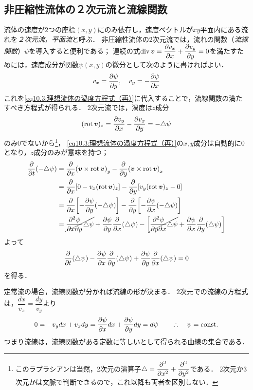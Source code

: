 \subsection*{非圧縮性流体の２次元流と流線関数}
流体の速度が2つの座標$(x,y)$にのみ依存し，速度ベクトルが$xy$平面内にある流れを\emph{２次元流，平面流}と呼ぶ．
非圧縮性流体の2次元流では，流れの関数（\emph{流線関数}）$\psi$を導入すると便利である；
連続の式$\Div\v = \dpdv{v_x}{x} + \dpdv{v_y}{y} = 0$を満たすためには，速度成分が関数$\psi(x,y)$の微分として次のように書ければよい．
\begin{equation}
    v_x = \pdv{\psi}{y}, \quad v_y = -\pdv{\psi}{x}
\end{equation}
これを\eqref{eq10.3:理想流体の渦度方程式（再）}に代入することで，流線関数の満たすべき方程式が得られる．
2次元流では，渦度は$z$成分
\[
    (\operatorname{rot}\vb*{v})_z = \pdv{v_y}{x} - \pdv{v_x}{y} = -\triangle\psi
\]
のみ0でないから\footnote{
このラプラシアンは当然，2次元の演算子$\Laplacian = \dpdv[2]{x} + \dpdv[2]{y}$である．
2次元か3次元かは文脈で判断できるので，これ以降も両者を区別しない．
}，
\eqref{eq10.3:理想流体の渦度方程式（再）}の$x,y$成分は自動的に0となり，$z$成分のみが意味を持つ；
\begin{align*}
    \pdv{t}(-\Laplacian\psi) &= \pdv{x} \pqty{\v\times\Rot\v}_y - \pdv{y} \pqty{\v\times\Rot\v}_x \\
    &= \pdv{x} \bqty{ 0-v_x(\Rot\v)_z } - \pdv{y} \bqty{ v_y(\Rot\v)_z -0 } \\
    &= \pdv{x} \bqty{ {-\pdv{\psi}{y}} (-\Laplacian\psi) } - \pdv{y} \bqty{ {-\pdv{\psi}{x}}(-\Laplacian\psi) } \\
    &= \cancel{ \pdv{\psi}{x}{y} \Laplacian\psi } + \pdv{\psi}{y} \pdv{x}(\Laplacian\psi)
    - \bqty{ \cancel{ \pdv{\psi}{y}{x} \Laplacian\psi } + \pdv{\psi}{x} \pdv{y}(\Laplacian\psi) } 
\end{align*}
よって
\begin{equation}
    \pdv{t}(\triangle\psi) - \pdv{\psi}{x} \pdv{y}(\triangle\psi) + \pdv{\psi}{y} \pdv{x}(\triangle\psi) = 0
\end{equation}
を得る．


定常流の場合，流線関数が分かれば流線の形が決まる．
2次元での流線の方程式は，$ \dfrac{dx}{v_x} = \dfrac{dy}{v_y} $より
\[
    0 = -v_y dx + v_x dy = \pdv{\psi}{x} dx + \pdv{\psi}{y} dy = d\psi
    \qquad\therefore\quad \psi = \mathrm{const.}
\]
つまり流線は，流線関数がある定数に等しいとして得られる曲線の集合である．


